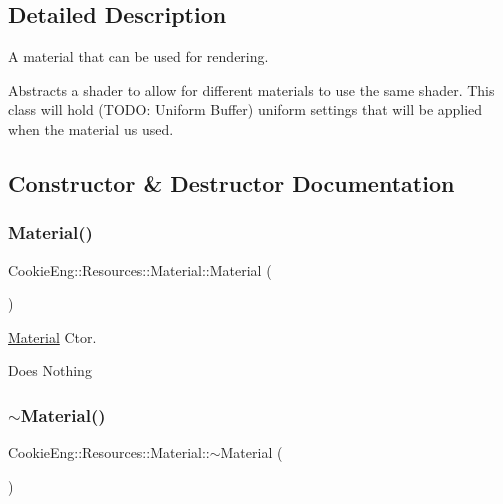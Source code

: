 \subsection{Detailed Description}
A material that can be used for rendering. 

Abstracts a shader to allow for different materials to use the same shader. This class will hold (T\+O\+DO\+: Uniform Buffer) uniform settings that will be applied when the material us used. 

\subsection{Constructor \& Destructor Documentation}
\mbox{\label{class_cookie_eng_1_1_resources_1_1_material_a20a77072223e5948a5842aa71cf04eff}} 
\subsubsection{\texorpdfstring{Material()}{Material()}}
{\footnotesize\ttfamily Cookie\+Eng\+::\+Resources\+::\+Material\+::\+Material (\begin{DoxyParamCaption}{ }\end{DoxyParamCaption})\hspace{0.3cm}{\ttfamily [inline]}}



\hyperlink{class_cookie_eng_1_1_resources_1_1_material}{Material} Ctor. 

Does Nothing \mbox{\label{class_cookie_eng_1_1_resources_1_1_material_aa2fb7a1c6a22e6e3a4271ad4aca8f0a6}} 
\subsubsection{\texorpdfstring{$\sim$\+Material()}{~Material()}}
{\footnotesize\ttfamily Cookie\+Eng\+::\+Resources\+::\+Material\+::$\sim$\+Material (\begin{DoxyParamCaption}{ }\end{DoxyParamCaption})\hspace{0.3cm}{\ttfamily [inline]}}



